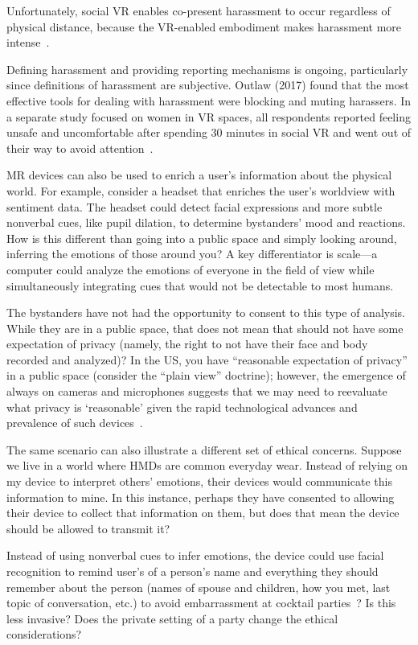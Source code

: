 Unfortunately, social VR enables co-present harassment to occur regardless of physical distance, because the VR-enabled embodiment  makes harassment more intense~\cite{blackwell}.

Defining harassment and providing reporting mechanisms is ongoing, particularly since definitions of harassment are subjective. Outlaw (2017) found that the most effective tools for dealing with harassment were blocking and muting harassers. In a separate study focused on women in VR spaces, all respondents reported feeling unsafe and uncomfortable after spending 30 minutes in social VR and went out of their way to avoid attention~\cite{outlaw2017}.

MR devices can also be used to enrich a user's information about the physical world. For example, consider a headset that enriches the user's worldview with sentiment data. The headset could detect facial expressions and more subtle nonverbal cues, like pupil dilation, to determine bystanders' mood and reactions. How is this different than going into a public space and simply looking around, inferring the emotions of those around you? A key differentiator is scale---a computer could analyze the emotions of everyone in the field of view while simultaneously integrating cues that would not be detectable to most humans.

The bystanders have not had the opportunity to consent to this type of analysis. While they are in a public space, that does not mean that should not have some expectation of privacy (namely, the right to not have their face and body recorded and analyzed)? In the US, you have ``reasonable expectation of privacy'' in a public space (consider the ``plain view'' doctrine); however, the emergence of always on cameras and microphones suggests that we may need to reevaluate what privacy is `reasonable' given the rapid technological advances and prevalence of such devices~\cite{bellotti1993design}.

The same scenario can also illustrate a different set of ethical concerns. Suppose we live in a world where HMDs are common everyday wear. Instead of relying on my device to interpret others' emotions, their devices would communicate this information to mine. In this instance, perhaps they have consented to allowing their device to collect that information on them, but does that mean the device should be allowed to transmit it?

Instead of using nonverbal cues to infer emotions, the device could use facial recognition to remind user's of a person's name and everything they should remember about the person (names of spouse and children, how you met, last topic of conversation, etc.) to avoid embarrassment at cocktail parties~\cite{wassom2014augmented}? Is this less invasive? Does the private setting of a party change the ethical considerations?


